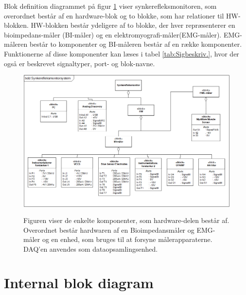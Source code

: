 Blok definition diagrammet på figur \ref{figbdd} viser synkerefleksmonitoren, som overordnet består af en hardware-blok og to blokke, som har relationer til HW-blokken. HW-blokken består ydeligere af to blokke, der hver repræsenterer en bioimpedans-måler (BI-måler) og en elektromyografi-måler(EMG-måler). EMG-måleren består to komponenter og BI-måleren består af en række komponenter. Funktionerne af disse komponenter kan læses i tabel \ref{tab:Sigbeskriv.}, hvor der også er beskrevet signaltyper, port- og blok-navne.  

\begin{figure}[H] 
\centering
{\includegraphics[width=\linewidth]
{Figure/BDD2}}
\caption{Figuren viser de enkelte komponenter, som hardware-delen består af. Overordnet består hardwaren af en Bioimpedansmåler og EMG-måler og en enhed, som bruges til at forsyne  målerapparaterne. DAQ'en anvendes som dataopsamlingsenhed.}
\label{figbdd}
\end{figure}

\section{Internal blok diagram}

